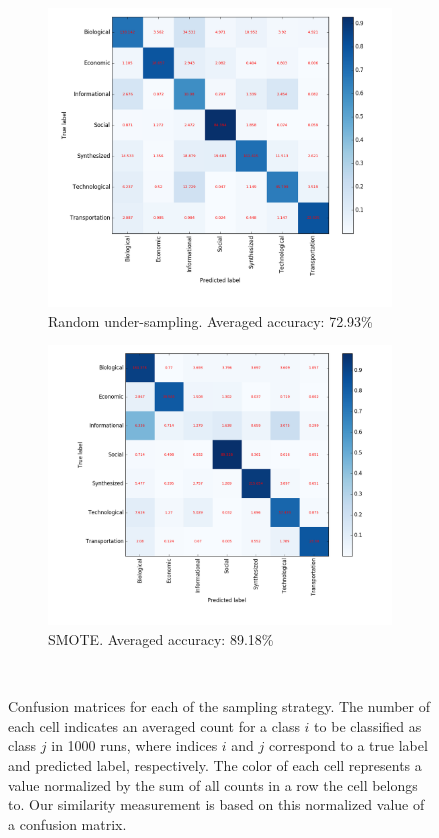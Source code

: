 \documentclass{article}
\begin{document}
\begin{figure}[H]
\medskip
\begin{subfigure}{0.48\textwidth}
\includegraphics[width=\linewidth]{figs/similarity/Domain/RandomUnder_26/confusion.png}
\caption{Random under-sampling. Averaged accuracy: 72.93\%} \label{random_under_confusion}
\end{subfigure}\hspace*{\fill}
\begin{subfigure}{0.48\textwidth}
\includegraphics[width=\linewidth]{figs/similarity/Domain/SMOTE/confusion.png}
\caption{SMOTE. Averaged accuracy: 89.18\%} \label{smote_confusion}
\end{subfigure}
\
\caption{Confusion matrices for each of the sampling strategy. The number of each cell indicates an averaged count for a class $i$ to be classified as class $j$ in 1000 runs, where indices $i$ and $j$ correspond to a true label and predicted label, respectively. The color of each cell represents a value normalized by the sum of all counts in a row the cell belongs to. Our similarity measurement is based on this normalized value of a confusion matrix.} \label{confusion}
\end{figure}


\clearpage


 
\end{document}
